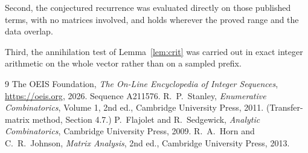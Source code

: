\documentclass[11pt,a4paper]{article}
\theoremstyle{plain}
\theoremstyle{definition}
\begin{document}
Second, the conjectured recurrence was evaluated directly on those published terms, with no
matrices involved, and holds wherever the proved range and the data overlap.

Third, the annihilation test of Lemma~\ref{lem:crit} was carried out in exact integer
arithmetic on the whole vector rather than on a sampled prefix.

\begin{thebibliography}{9}
 The OEIS Foundation, \emph{The On-Line Encyclopedia of Integer
Sequences}, \url{https://oeis.org}, 2026. Sequence A211576.
 R.~P.~Stanley, \emph{Enumerative Combinatorics}, Volume 1, 2nd ed.,
Cambridge University Press, 2011. (Transfer-matrix method, Section 4.7.)
 P.~Flajolet and R.~Sedgewick, \emph{Analytic Combinatorics}, Cambridge
University Press, 2009.
 R.~A.~Horn and C.~R.~Johnson, \emph{Matrix Analysis}, 2nd ed., Cambridge
University Press, 2013.
\end{thebibliography}
\end{document}

